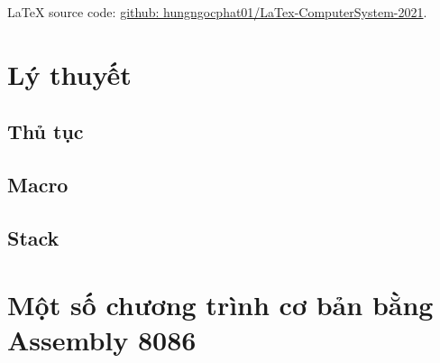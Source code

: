 \documentclass[12pt]{report}
\begin{document}
{\LaTeX} source code: \href{https://github.com/hungngocphat01/LaTex-ComputerSystem-2021}{github: hungngocphat01/LaTex-ComputerSystem-2021}.
\pagebreak

\renewcommand*\contentsname{Mục lục}
\setcounter{tocdepth}{2}
\tableofcontents
\pagebreak

\chapter{Lý thuyết} \label{chapterLyThuyet}
\pagebreak









\subsection{}

\section{Thủ tục}

\section{Macro}

\section{Stack}

\chapter{Một số chương trình cơ bản bằng Assembly 8086} \label{chapterBaiTap}


\renewcommand{\bibname}{Tài liệu tham khảo}


\end{document}
